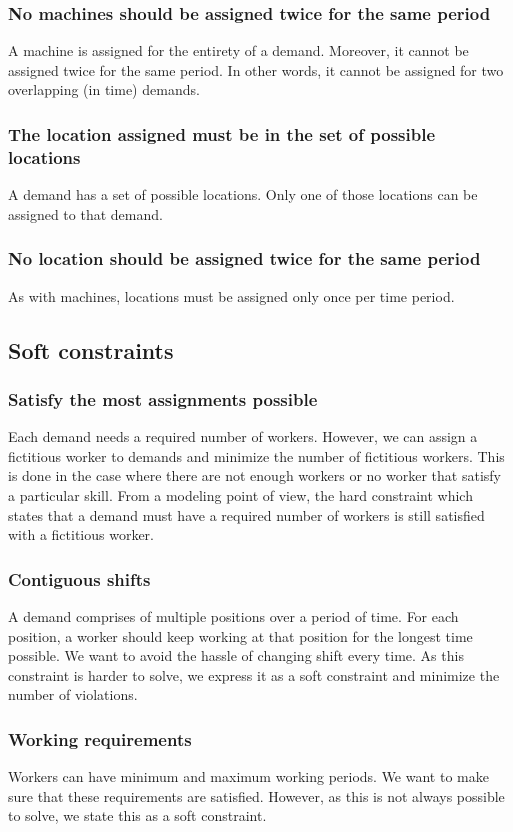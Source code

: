 \documentclass[../thesis.tex]{subfiles}
\begin{document}
\subsubsection{No machines should be assigned twice for the same period}

A machine is assigned for the entirety of a demand. Moreover, it cannot be assigned twice 
for the same period. In other words, it cannot be assigned for two overlapping (in time) demands.


\subsubsection{The location assigned must be in the set of possible locations}

A demand has a set of possible locations. Only one of those locations can be assigned 
to that demand.

\subsubsection{No location should be assigned twice for the same period}

As with machines, locations must be assigned only once per time period.


\subsection{Soft constraints}

\subsubsection{Satisfy the most assignments possible}

Each demand needs a required number of workers. However, we can assign a fictitious worker to demands 
and minimize the number of fictitious workers. This is done in the case where there are not enough workers
or no worker that satisfy a particular skill. From a modeling point of view, the hard constraint which states that 
a demand must have a required number of workers is still satisfied with a fictitious worker.

\subsubsection{Contiguous shifts}

A demand comprises of multiple positions over a period of time. 
For each position, a worker should keep working at that position for the longest time possible. 
We want to avoid the hassle of changing shift every time. 
As this constraint is harder to solve, we express it as a soft constraint and minimize the number of 
violations.

\subsubsection{Working requirements}

Workers can have minimum and maximum working periods. We want to make sure 
that these requirements are satisfied. However, as this is not always possible to solve, we 
state this as a soft constraint.
\end{document}
